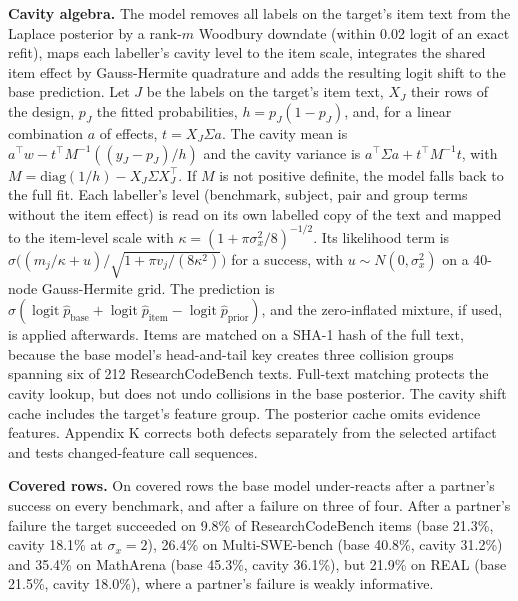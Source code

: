 \documentclass[
]{article}
\begin{document}
\textbf{Cavity algebra.} The model removes all labels on the target's
item text from the Laplace posterior by a rank-\(m\) Woodbury downdate
(within 0.02 logit of an exact refit), maps each labeller's cavity level
to the item scale, integrates the shared item effect by Gauss-Hermite
quadrature and adds the resulting logit shift to the base prediction.
Let \(J\) be the labels on the target's item text, \(X_J\) their rows of
the design, \(p_J\) the fitted probabilities, \(h = p_J(1 - p_J)\), and,
for a linear combination \(a\) of effects, \(t = X_J\Sigma a\). The
cavity mean is \(a^\top w - t^\top M^{-1}((y_J - p_J)/h)\) and the
cavity variance is \(a^\top\Sigma a + t^\top M^{-1} t\), with \(M =
\mathrm{diag}(1/h) - X_J\Sigma X_J^\top\). If \(M\) is not positive
definite, the model falls back to the full fit. Each labeller's level
(benchmark, subject, pair and group terms without the item effect) is
read on its own labelled copy of the text and mapped to the item-level
scale with \(\kappa = (1 + \pi\sigma_x^2/8)^{-1/2}\). Its likelihood
term is
\(\sigma\big((m_j/\kappa + u)/\sqrt{1 + \pi v_j/(8\kappa^2)}\big)\) for
a success, with \(u \sim N(0, \sigma_x^2)\) on a 40-node Gauss-Hermite
grid. The prediction is
\(\sigma(\operatorname{logit}\hat p_{\mathrm{base}} +
\operatorname{logit}\hat p_{\mathrm{item}} - \operatorname{logit}\hat p_{\mathrm{prior}})\),
and the zero-inflated mixture, if used, is applied afterwards. Items are
matched on a SHA-1 hash of the full text, because the base model's
head-and-tail key creates three collision groups spanning six of 212
ResearchCodeBench texts. Full-text matching protects the cavity lookup,
but does not undo collisions in the base posterior. The cavity shift
cache includes the target's feature group. The posterior cache omits
evidence features. Appendix K corrects both defects separately from the
selected artifact and tests changed-feature call sequences.

\textbf{Covered rows.} On covered rows the base model under-reacts after
a partner's success on every benchmark, and after a failure on three of
four. After a partner's failure the target succeeded on 9.8\% of
ResearchCodeBench items (base 21.3\%, cavity 18.1\% at
\(\sigma_x = 2\)), 26.4\% on Multi-SWE-bench (base 40.8\%, cavity
31.2\%) and 35.4\% on MathArena (base 45.3\%, cavity 36.1\%), but 21.9\%
on REAL (base 21.5\%, cavity 18.0\%), where a partner's failure is
weakly informative.
\end{document}
